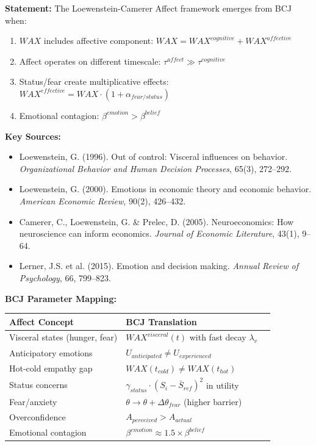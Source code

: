 \begin{tcolorbox}[colback=orange!5!white, colframe=orange!75!black,
    title=Theorem BCJ-T42: Affect \& Emotion as Special Case]
\textbf{Statement:} The Loewenstein-Camerer Affect framework emerges from BCJ when:
\begin{enumerate}[nosep]
\item $WAX$ includes affective component: $WAX = WAX^{cognitive} + WAX^{affective}$
\item Affect operates on different timescale: $\tau^{affect} \gg \tau^{cognitive}$
\item Status/fear create multiplicative effects: $WAX^{effective} = WAX \cdot (1 + \alpha_{fear/status})$
\item Emotional contagion: $\beta^{emotion} > \beta^{belief}$
\end{enumerate}

\textbf{Key Sources:}
\begin{itemize}[nosep]
\item Loewenstein, G. (1996). Out of control: Visceral influences on behavior. \textit{Organizational Behavior and Human Decision Processes}, 65(3), 272--292.
\item Loewenstein, G. (2000). Emotions in economic theory and economic behavior. \textit{American Economic Review}, 90(2), 426--432.
\item Camerer, C., Loewenstein, G. \& Prelec, D. (2005). Neuroeconomics: How neuroscience can inform economics. \textit{Journal of Economic Literature}, 43(1), 9--64.
\item Lerner, J.S. et al. (2015). Emotion and decision making. \textit{Annual Review of Psychology}, 66, 799--823.
\end{itemize}

\textbf{BCJ Parameter Mapping:}
\begin{center}
\begin{tabular}{lll}
\toprule
\textbf{Affect Concept} & \textbf{BCJ Translation} \\
\midrule
Visceral states (hunger, fear) & $WAX^{visceral}(t)$ with fast decay $\lambda_v$ \\
Anticipatory emotions & $U_{anticipated} \neq U_{experienced}$ \\
Hot-cold empathy gap & $WAX(t_{cold}) \neq WAX(t_{hot})$ \\
Status concerns & $\gamma_{status} \cdot (S_i - \bar{S}_{ref})^2$ in utility \\
Fear/anxiety & $\theta \to \theta + \Delta\theta_{fear}$ (higher barrier) \\
Overconfidence & $A_{perceived} > A_{actual}$ \\
Emotional contagion & $\beta^{emotion} \approx 1.5 \times \beta^{belief}$ \\
\bottomrule
\end{tabular}
\end{center}


\end{tcolorbox}
